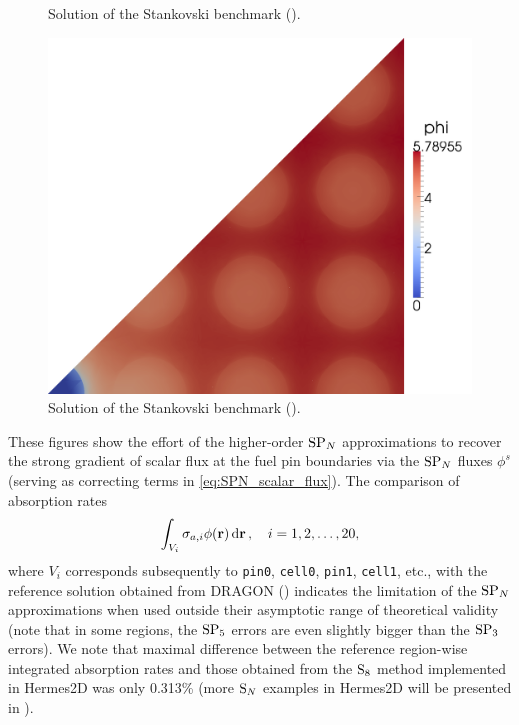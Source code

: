 \begin{figure}[!ht]
{}
  \caption[Solution of the Stankovski benchmark ($\text{SP}_5$)]{Solution of the Stankovski benchmark
   (\SPN[5]).}
  \label{fig:37}
\end{figure}
\begin{figure}[!ht]
\centering
  \includegraphics[scale=.11]{stankov/s8.png}
  \caption[Solution of the Stankovski benchmark ($\text{S}_8$)]{Solution of the Stankovski benchmark
   (\SN[8]).}
  \label{fig:38}
\end{figure}

These figures show the effort of the higher-order $\SPN$
approximations to recover the strong gradient of scalar flux at the fuel pin boundaries via the $\SPN$ fluxes $\phi^s$
(serving as correcting terms in \eqref{eq:SPN_scalar_flux}). The comparison of absorption rates
$$
	\int_{V_i} \sigma_{a,i} \phi(\br)\,\d{\br},\quad i = 1,2,\ldots,20,
$$
where $V_i$ corresponds subsequently to \texttt{pin0}, \texttt{cell0}, \texttt{pin1}, \texttt{cell1}, etc., with the
reference solution obtained from DRAGON () indicates the limitation of the $\SPN$ approximations
when used outside their asymptotic range of theoretical validity (note that in some regions, the $\SPN[5]$ errors are even slightly bigger than the
$\SPN[3]$ errors). We note that maximal difference between the reference region-wise integrated absorption rates and
those obtained from the $\SN[8]$ method implemented in Hermes2D was only 0.313\% (more $\SN$ examples in Hermes2D will
be presented in ).


